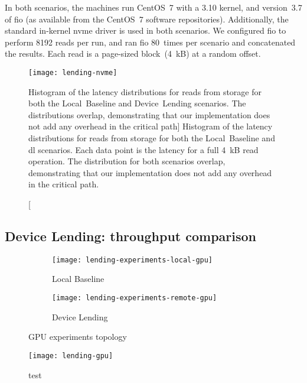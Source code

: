 %
In both scenarios, the machines run CentOS~7 with a 3.10 kernel, and version~3.7 of \gls{fio} (as available from the CentOS~7 software repositories).
%
Additionally, the standard in-kernel \gls{nvme} driver is used in both scenarios.
%
We configured \gls{fio} to perform 8192 reads per run, and ran \gls{fio} 80~times per scenario and concatenated the results.
%
Each read is a page-sized block~(4~kB) at a random offset.

\begin{figure}
    \centering
    \texttt{[image: lending-nvme]}
    \caption
    [Histogram of the latency distributions for reads from storage for both the Local~Baseline and Device~Lending scenarios. The distributions overlap, demonstrating that our implementation does not add any overhead in the critical  path]
    {Histogram of the latency distributions for reads from storage for both the Local~Baseline and \gls{dl} scenarios. Each data point is the latency for a full 4~kB read operation. The distribution for both scenarios overlap, demonstrating that our implementation does not add any overhead in the critical  path.}
    \label{fig:eval-lending-nvme-results}
\end{figure}







\subsection{Device Lending: throughput comparison}
\begin{figure}
    \centering
    \begin{subfigure}{\linewidth}
        \centering
        \texttt{[image: lending-experiments-local-gpu]}
        \caption{Local Baseline}
    \end{subfigure}
    \par\vspace{5mm}
    \begin{subfigure}{\linewidth}
        \centering
        \texttt{[image: lending-experiments-remote-gpu]}
        \caption{Device Lending}
    \end{subfigure}
    \caption{GPU experiments topology}
\end{figure}
\begin{figure}
    \centering
    \texttt{[image: lending-gpu]}
    \caption{test}
\end{figure}


